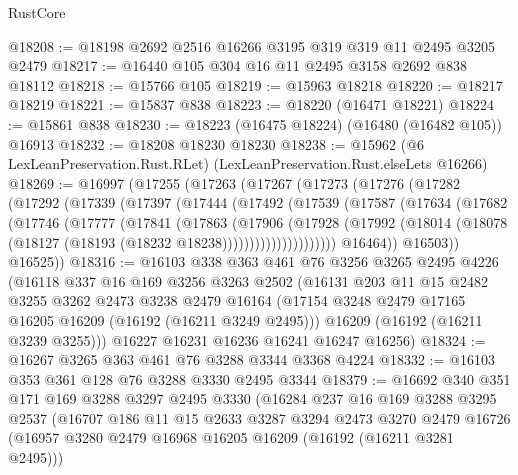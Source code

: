 \begin{lexlean}{RustCore}
\begin{coremodule}
@18208 := @18198 @2692 @2516 @16266 @3195 @319 @319 @11 @2495 @3205 @2479
@18217 := @16440 @105 @304 @16 @11 @2495 @3158 @2692 @838 @18112
@18218 := @15766 @105
@18219 := @15963 @18218
@18220 := @18217 @18219
@18221 := @15837 @838
@18223 := @18220 (@16471 @18221)
@18224 := @15861 @838
@18230 := @18223 (@16475 @18224) (@16480 (@16482 @105)) @16913
@18232 := @18208 @18230 @18230
@18238 := @15962 (@6 LexLeanPreservation.Rust.RLet) (LexLeanPreservation.Rust.elseLets @16266)
@18269 := @16997
    (@17255
      (@17263
        (@17267
          (@17273
            (@17276
              (@17282
                (@17292
                  (@17339
                    (@17397
                      (@17444
                        (@17492
                          (@17539
                            (@17587
                              (@17634
                                (@17682
                                  (@17746
                                    (@17777
                                      (@17841
                                        (@17863
                                          (@17906
                                            (@17928
                                              (@17992
                                                (@18014
                                                  (@18078
                                                    (@18127
                                                      (@18193 (@18232 @18238)))))))))))))))))))))
                @16464))
            @16503))
        @16525))
@18316 := @16103
    @338
    @363
    @461
    @76
    @3256
    @3265
    @2495
    @4226
    (@16118
      @337
      @16
      @169
      @3256
      @3263
      @2502
      (@16131
        @203
        @11
        @15
        @2482
        @3255
        @3262
        @2473
        @3238
        @2479
        @16164
        (@17154 @3248 @2479 @17165 @16205 @16209 (@16192 (@16211 @3249 @2495)))
        @16209
        (@16192 (@16211 @3239 @3255)))
      @16227
      @16231
      @16236
      @16241
      @16247
      @16256)
@18324 := @16267 @3265 @363 @461 @76 @3288 @3344 @3368 @4224
@18332 := @16103 @353 @361 @128 @76 @3288 @3330 @2495 @3344
@18379 := @16692
    @340
    @351
    @171
    @169
    @3288
    @3297
    @2495
    @3330
    (@16284
      @237
      @16
      @169
      @3288
      @3295
      @2537
      (@16707
        @186
        @11
        @15
        @2633
        @3287
        @3294
        @2473
        @3270
        @2479
        @16726
        (@16957 @3280 @2479 @16968 @16205 @16209 (@16192 (@16211 @3281 @2495)))

\end{coremodule}
\end{lexlean}
